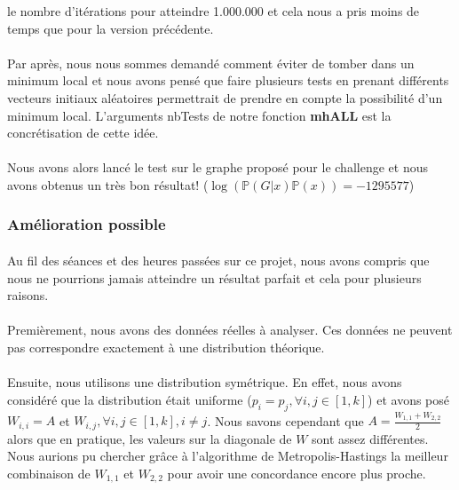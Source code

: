 le nombre d'itérations pour atteindre 1.000.000 et cela nous a pris moins de temps que pour la  version précédente.
\\\\
Par après, nous nous sommes demandé comment 
éviter de tomber dans un minimum local et nous avons pensé que faire plusieurs tests en prenant 
différents vecteurs initiaux aléatoires permettrait de prendre en compte la possibilité d'un minimum local.
L'arguments nbTests de notre fonction \textbf{mhALL} est la concrétisation de cette idée.
\\\\
Nous avons alors lancé le test sur le graphe proposé pour le challenge et nous avons obtenus un très 
bon résultat! ($\log(\mathbb{P}(G|x)\mathbb{P}(x)) = -1295577$)
\subsubsection*{Amélioration possible}
\paragraph*{}
Au fil des séances et des heures passées sur ce projet, nous avons compris que nous ne pourrions jamais 
atteindre un résultat parfait et cela pour plusieurs raisons. 
\\\\
Premièrement, nous avons des données réelles à analyser. Ces données ne peuvent pas correspondre exactement
à une distribution théorique. 
\\\\
Ensuite, nous utilisons une distribution symétrique. En effet, nous avons considéré que la distribution
était uniforme ($p_i = p_j ,\forall i,j \in[1,k]$) et avons posé $W_{i,i}=A$ et $W_{i,j},\forall i,j \in [1,k] ,i \ne j$.
Nous savons cependant que $A = \frac{W_{1,1}+W_{2,2}}{2}$ alors que en pratique, les valeurs sur la diagonale de $W$
sont assez différentes. Nous aurions pu chercher grâce à l'algorithme de Metropolis-Hastings la meilleur combinaison de 
$W_{1,1}$ et $W_{2,2}$ pour avoir une concordance encore plus proche. 